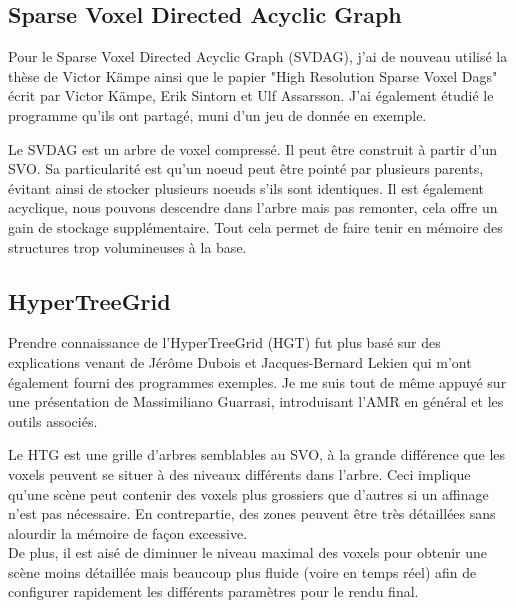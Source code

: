 \documentclass[12pt,a4paper,twoside]{article}
\begin{document}
    \subsection{Sparse Voxel Directed Acyclic Graph}

    Pour le Sparse Voxel Directed Acyclic Graph (SVDAG), j'ai de nouveau utilisé la thèse de Victor Kämpe\cite{kampethesis2016} ainsi que le papier
    "High Resolution Sparse Voxel Dags"\cite{kampe2013sg} écrit par Victor Kämpe, Erik Sintorn et Ulf Assarsson. J'ai également étudié le
    programme qu'ils ont partagé, muni d'un jeu de donnée en exemple.

    Le SVDAG est un arbre de voxel compressé. Il peut être construit à partir d'un SVO.
    Sa particularité est qu'un noeud peut être pointé par plusieurs parents, évitant ainsi de stocker plusieurs noeuds s'ils sont identiques.
    Il est également acyclique, nous pouvons descendre dans l'arbre mais pas remonter, cela offre un gain de stockage supplémentaire.
    Tout cela permet de faire tenir en mémoire des structures trop volumineuses à la base.

    \begin{figure}[H]
    \end{figure}

    \begin{figure}[H]
    \end{figure}
    \newpage
    \subsection{HyperTreeGrid}

    Prendre connaissance de l'HyperTreeGrid (HGT) fut plus basé sur des explications venant de
    Jérôme Dubois et Jacques-Bernard Lekien qui m'ont également fourni des programmes exemples. Je me suis tout de même
    appuyé sur une présentation de Massimiliano Guarrasi\cite{amr2015}, introduisant l'AMR en général et les outils associés.

    Le HTG est une grille d'arbres semblables au SVO, à la grande différence que les voxels peuvent se situer à des niveaux différents dans l'arbre.
    Ceci implique qu'une scène peut contenir des voxels plus grossiers que d'autres si un affinage n'est pas nécessaire.
    En contrepartie, des zones peuvent être très détaillées sans alourdir la mémoire de façon excessive. \\
    De plus, il est aisé de diminuer le niveau maximal des voxels pour obtenir une scène moins détaillée
    mais beaucoup plus fluide (voire en temps réel) afin de configurer rapidement les différents paramètres pour le rendu final.
\end{document}
